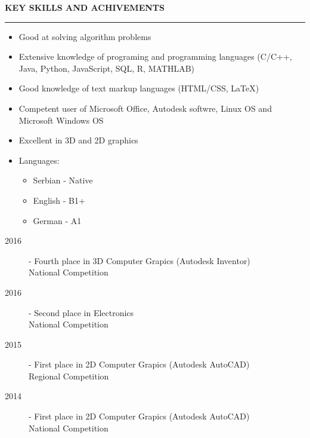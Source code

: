 \documentclass{article}
\begin{document}
\textbf{\large KEY SKILLS AND ACHIVEMENTS}\\
\color{my_col}\noindent\rule{15.4cm}{0.6pt}\color{black}
\normalsize
\begin{itemize}
  \item Good at solving algorithm problems
  \item Extensive knowledge of programing and programming languages 
  (C/C++, Java, Python, JavaScript, SQL, R, MATHLAB)
  \item Good knowledge of text markup languages (HTML/CSS, LaTeX)
  \item Competent user of Microsoft Office, Autodesk softwre, 
  Linux OS and Microsoft Windows OS
  \item Excellent in 3D and 2D graphics 
  \item Languages:
	\begin{itemize}	\small
		\item Serbian - Native
		\item English - B1+
		\item German - A1
	\end{itemize}
\end{itemize}

\begin{description}
    \item[ 2016] - Fourth place in 3D Computer Grapics (Autodesk Inventor)\\
    National Competition
    \item[ 2016] - Second place in Electronics\\
    National Competition
    \item[ 2015] - First place in 2D Computer Grapics (Autodesk AutoCAD)\\
    Regional Competition
    \item[ 2014] - First place in 2D Computer Grapics (Autodesk AutoCAD)\\
    National Competition
\end{description}
\end{document}
